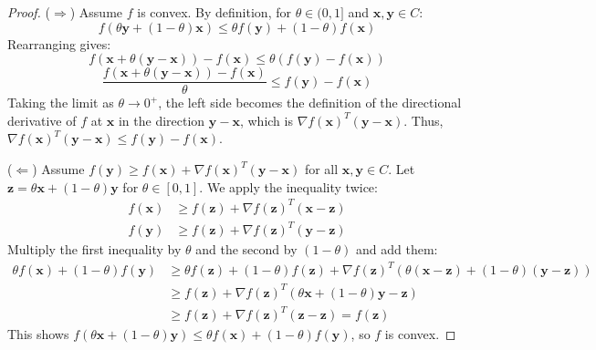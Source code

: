 \documentclass{MathNote}
\begin{document}
\begin{proof}
	($\Rightarrow$) Assume $f$ is convex. By definition, for $\theta \in (0, 1]$ and $\bm{x}, \bm{y} \in C$:
	$$ f(\theta\bm{y} + (1-\theta)\bm{x}) \le \theta f(\bm{y}) + (1-\theta)f(\bm{x}) $$
	Rearranging gives:
	$$ f(\bm{x} + \theta(\bm{y}-\bm{x})) - f(\bm{x}) \le \theta(f(\bm{y}) - f(\bm{x})) $$
	$$ \frac{f(\bm{x} + \theta(\bm{y}-\bm{x})) - f(\bm{x})}{\theta} \le f(\bm{y}) - f(\bm{x}) $$
	Taking the limit as $\theta \to 0^+$, the left side becomes the definition of the directional derivative of $f$ at $\bm{x}$ in the direction $\bm{y}-\bm{x}$, which is $\nabla f(\bm{x})^T (\bm{y}-\bm{x})$. Thus, $\nabla f(\bm{x})^T (\bm{y}-\bm{x}) \le f(\bm{y}) - f(\bm{x})$.

	($\Leftarrow$) Assume $f(\bm{y}) \ge f(\bm{x}) + \nabla f(\bm{x})^T (\bm{y} - \bm{x})$ for all $\bm{x}, \bm{y} \in C$.
	Let $\bm{z} = \theta \bm{x} + (1-\theta) \bm{y}$ for $\theta \in [0,1]$. We apply the inequality twice:
	\begin{align*}
		f(\bm{x}) &\ge f(\bm{z}) + \nabla f(\bm{z})^T(\bm{x}-\bm{z}) \\
		f(\bm{y}) &\ge f(\bm{z}) + \nabla f(\bm{z})^T(\bm{y}-\bm{z})
	\end{align*}
	Multiply the first inequality by $\theta$ and the second by $(1-\theta)$ and add them:
	\begin{align*}
		\theta f(\bm{x}) + (1-\theta)f(\bm{y}) &\ge \theta f(\bm{z}) + (1-\theta)f(\bm{z}) + \nabla f(\bm{z})^T(\theta(\bm{x}-\bm{z}) + (1-\theta)(\bm{y}-\bm{z})) \\
		&\ge f(\bm{z}) + \nabla f(\bm{z})^T(\theta\bm{x} + (1-\theta)\bm{y} - \bm{z}) \\
		&\ge f(\bm{z}) + \nabla f(\bm{z})^T(\bm{z} - \bm{z}) = f(\bm{z})
	\end{align*}
	This shows $f(\theta \bm{x} + (1 - \theta)\bm{y}) \le \theta f(\bm{x}) + (1 - \theta) f(\bm{y})$, so $f$ is convex.
\end{proof}
\end{document}
